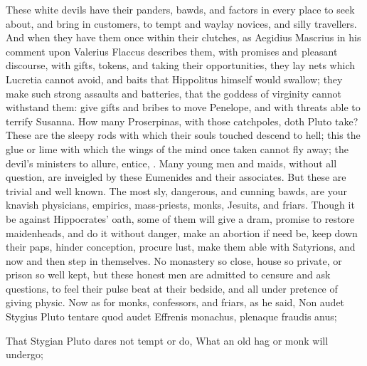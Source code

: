 {These white devils have their panders, bawds, and factors in every
place to seek about, and bring in customers, to tempt and waylay
novices, and silly travellers. And when they have them once within
their clutches, as Aegidius Mascrius in his comment upon Valerius
Flaccus describes them, with promises and pleasant discourse,
with gifts, tokens, and taking their opportunities, they lay nets which
Lucretia cannot avoid, and baits that Hippolitus himself would swallow;
they make such strong assaults and batteries, that the goddess of
virginity cannot withstand them: give gifts and bribes to move
Penelope, and with threats able to terrify Susanna. How many
Proserpinas, with those catchpoles, doth Pluto take? These are the
sleepy rods with which their souls touched descend to hell; this the
glue or lime with which the wings of the mind once taken cannot fly
away; the devil's ministers to allure, entice, \etc{}. Many young men and
maids, without all question, are inveigled by these Eumenides and their
associates. But these are trivial and well known. The most sly,
dangerous, and cunning bawds, are your knavish physicians, empirics,
mass-priests, monks, Jesuits, and friars. Though it be against
Hippocrates' oath, some of them will give a dram, promise to restore
maidenheads, and do it without danger, make an abortion if need be,
keep down their paps, hinder conception, procure lust, make them able
with Satyrions, and now and then step in themselves. No monastery so
close, house so private, or prison so well kept, but these honest men
are admitted to censure and ask questions, to feel their pulse beat at
their bedside, and all under pretence of giving physic. Now as for
monks, confessors, and friars, as he said,
Non audet Stygius Pluto tentare quod audet
Effrenis monachus, plenaque fraudis anus;

That Stygian Pluto dares not tempt or do,
What an old hag or monk will undergo;

}
